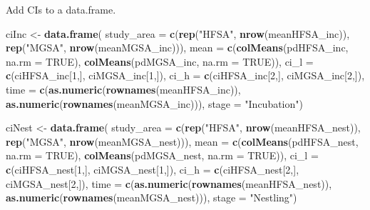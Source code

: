 \documentclass[]{article}
\newenvironment{Shaded}{\begin{snugshade}}{\end{snugshade}}
\newcommand{\DataTypeTok}[1]{\textcolor[rgb]{0.13,0.29,0.53}{#1}}
\newcommand{\DecValTok}[1]{\textcolor[rgb]{0.00,0.00,0.81}{#1}}
\newcommand{\KeywordTok}[1]{\textcolor[rgb]{0.13,0.29,0.53}{\textbf{#1}}}
\newcommand{\NormalTok}[1]{#1}
\newcommand{\OtherTok}[1]{\textcolor[rgb]{0.56,0.35,0.01}{#1}}
\newcommand{\StringTok}[1]{\textcolor[rgb]{0.31,0.60,0.02}{#1}}
\begin{document}
Add CIs to a data.frame.

\begin{Shaded}
\begin{Highlighting}[]
\NormalTok{ciInc <-}\StringTok{ }\KeywordTok{data.frame}\NormalTok{(}
    \DataTypeTok{study_area =} \KeywordTok{c}\NormalTok{(}\KeywordTok{rep}\NormalTok{(}\StringTok{"HFSA"}\NormalTok{, }\KeywordTok{nrow}\NormalTok{(meanHFSA_inc)), }\KeywordTok{rep}\NormalTok{(}\StringTok{"MGSA"}\NormalTok{, }\KeywordTok{nrow}\NormalTok{(meanMGSA_inc))),}
    \DataTypeTok{mean =} \KeywordTok{c}\NormalTok{(}\KeywordTok{colMeans}\NormalTok{(pdHFSA_inc, }\DataTypeTok{na.rm =} \OtherTok{TRUE}\NormalTok{), }\KeywordTok{colMeans}\NormalTok{(pdMGSA_inc, }\DataTypeTok{na.rm =} \OtherTok{TRUE}\NormalTok{)),}
    \DataTypeTok{ci_l =} \KeywordTok{c}\NormalTok{(ciHFSA_inc[}\DecValTok{1}\NormalTok{,], ciMGSA_inc[}\DecValTok{1}\NormalTok{,]),}
    \DataTypeTok{ci_h =} \KeywordTok{c}\NormalTok{(ciHFSA_inc[}\DecValTok{2}\NormalTok{,], ciMGSA_inc[}\DecValTok{2}\NormalTok{,]),}
    \DataTypeTok{time =} \KeywordTok{c}\NormalTok{(}\KeywordTok{as.numeric}\NormalTok{(}\KeywordTok{rownames}\NormalTok{(meanHFSA_inc)), }\KeywordTok{as.numeric}\NormalTok{(}\KeywordTok{rownames}\NormalTok{(meanMGSA_inc))),}
    \DataTypeTok{stage =} \StringTok{"Incubation"}\NormalTok{)}


\NormalTok{ciNest <-}\StringTok{ }\KeywordTok{data.frame}\NormalTok{(}
    \DataTypeTok{study_area =} \KeywordTok{c}\NormalTok{(}\KeywordTok{rep}\NormalTok{(}\StringTok{"HFSA"}\NormalTok{, }\KeywordTok{nrow}\NormalTok{(meanHFSA_nest)), }\KeywordTok{rep}\NormalTok{(}\StringTok{"MGSA"}\NormalTok{, }\KeywordTok{nrow}\NormalTok{(meanMGSA_nest))),}
    \DataTypeTok{mean =} \KeywordTok{c}\NormalTok{(}\KeywordTok{colMeans}\NormalTok{(pdHFSA_nest, }\DataTypeTok{na.rm =} \OtherTok{TRUE}\NormalTok{), }\KeywordTok{colMeans}\NormalTok{(pdMGSA_nest, }\DataTypeTok{na.rm =} \OtherTok{TRUE}\NormalTok{)),}
    \DataTypeTok{ci_l =} \KeywordTok{c}\NormalTok{(ciHFSA_nest[}\DecValTok{1}\NormalTok{,], ciMGSA_nest[}\DecValTok{1}\NormalTok{,]),}
    \DataTypeTok{ci_h =} \KeywordTok{c}\NormalTok{(ciHFSA_nest[}\DecValTok{2}\NormalTok{,], ciMGSA_nest[}\DecValTok{2}\NormalTok{,]),}
    \DataTypeTok{time =} \KeywordTok{c}\NormalTok{(}\KeywordTok{as.numeric}\NormalTok{(}\KeywordTok{rownames}\NormalTok{(meanHFSA_nest)), }\KeywordTok{as.numeric}\NormalTok{(}\KeywordTok{rownames}\NormalTok{(meanMGSA_nest))),}
    \DataTypeTok{stage =} \StringTok{"Nestling"}\NormalTok{)}
\end{Highlighting}
\end{Shaded}
\end{document}

